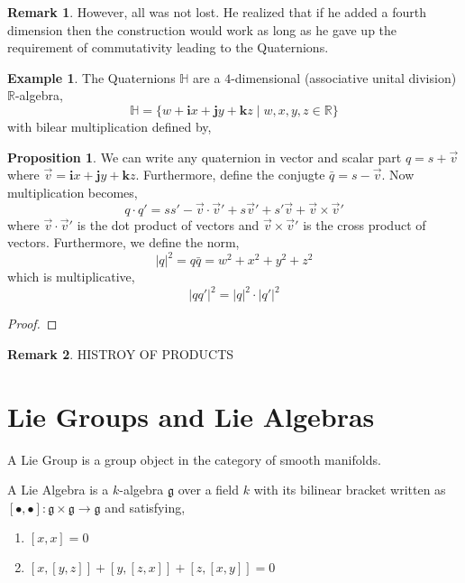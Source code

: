 \documentclass[12pt]{extarticle}
\newcommand{\R}{\mathbb{R}}
\theoremstyle{definition}
\newtheorem{proposition}[theorem]{Proposition}
\newtheorem{example}[theorem]{Example}
\newtheorem{remark}{Remark}
\newenvironment{definition}[1][Definition:]{\begin{trivlist}
\item[\hskip \labelsep {\bfseries #1}]}{\end{trivlist}}
\renewcommand{\bf}[1]{\mathbf{#1}}
\newcommand{\g}{\mathfrak{g}}
\renewcommand{\H}{\mathbb{H}}
\begin{document}
\begin{remark}
However, all was not lost. He realized that if he added a fourth dimension then the construction would work as long as he gave up the requirement of commutativity leading to the Quaternions.
\end{remark}

\begin{example}
The Quaternions $\H$ are a $4$-dimensional (associative unital division) $\R$-algebra,
\[ \H = \{ w + \bf{i} x + \bf{j} y + \bf{k} z \mid w,x,y,z \in \R \} \]
with bilear multiplication defined by,
\[ \]
\end{example}

\begin{proposition}
We can write any quaternion in vector and scalar part $q = s + \vec{v}$ where $\vec{v} = \bf{i} x + \bf{j} y + \bf{k} z$. Furthermore, define the conjugte $\bar{q} = s - \vec{v}$. Now multiplication becomes,
\[ q \cdot q' = ss' - \vec{v} \cdot \vec{v}' + s \vec{v}' + s' \vec{v} + \vec{v} \times \vec{v}' \]
where $\vec{v} \cdot \vec{v}'$ is the dot product of vectors and $\vec{v} \times \vec{v}'$ is the cross product of vectors. Furthermore, we define the norm,
\[ |q|^2 = q \bar{q} = w^2 + x^2 + y^2 + z^2 \]
which is multiplicative,
\[ |q q'|^2 = |q|^2 \cdot |q'|^2 \]
\end{proposition}

\begin{proof}

\end{proof}

\begin{remark}
HISTROY OF PRODUCTS
\end{remark}


\section{Lie Groups and Lie Algebras}

\begin{definition}
A Lie Group is a group object in the category of smooth manifolds. 
\end{definition}

\begin{definition}
A Lie Algebra is a $k$-algebra $\g$ over a field $k$ with its bilinear bracket written as $[ \bullet, \bullet] : \g \times \g \to \g$ and satisfying,
\begin{enumerate}
\item $[x,x] = 0$
\item $[x, [y, z]] + [y, [z, x]] + [z, [x, y]] = 0$
\end{enumerate}
\end{definition}
\end{document}
